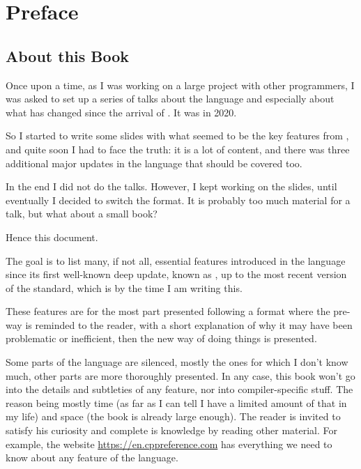 \chapter{Preface}
\renewcommand*\thesection{\arabic{section}}

\section{About this Book}

Once upon a time, as I was working on a large project with other
\cpp{} programmers, I was asked to set up a series of talks about the
language and especially about what has changed since the arrival of
. It was in 2020.

So I started to write some slides with what seemed to be the key
features from , and quite soon I had to face the truth: it is a
lot of content, and there was three additional major updates in the
language that should be covered too.

In the end I did not do the talks. However, I kept working on the
slides, until eventually I decided to switch the format. It is
probably too much material for a talk, but what about a small book?

Hence this document.

\bigskip

The goal is to list many, if not all, essential features introduced in
the \cpp{} language since its first well-known deep update, known as
, up to the most recent version of the standard, which is 
by the time I am writing this.

These features are for the most part presented following a format
where the pre- way is reminded to the reader, with a short
explanation of why it may have been problematic or inefficient, then
the new way of doing things is presented.

Some parts of the language are silenced, mostly the ones for which I
don't know much, other parts are more thoroughly presented. In any
case, this book won't go into the details and subtleties of any
feature, nor into compiler-specific stuff. The reason being mostly
time (as far as I can tell I have a limited amount of that in my life)
and space (the book is already large enough). The reader is invited to
satisfy his curiosity and complete is knowledge by reading other
material. For example, the website \url{https://en.cppreference.com}
has everything we need to know about any feature of the language.

